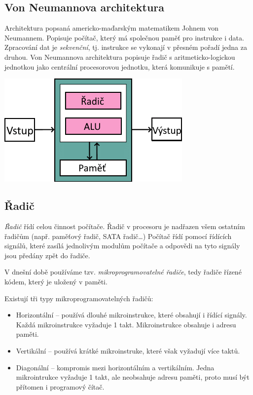 \documentclass[a4paper]{article}
\begin{document}
    \subsection{Von Neumannova architektura}
        Architektura popsaná americko-maďarským matematikem Johnem von Neumannem. Popisuje počítač, který má společnou paměť pro instrukce i data. Zpracování dat je \textit{sekvenční}, tj. instrukce se vykonají v přesném pořadí jedna za druhou. Von Neumannova architektura  popisuje řadič s aritmeticko-logickou jednotkou jako centrální procesorovou jednotku, která komunikuje s pamětí. \par
        \includegraphics{vonNeumann.png}\par
    \subsection{Řadič}
        \textit{Řadič} řídí celou činnost počítače. Řadič v procesoru je nadřazen všem ostatním řadičům (např. paměťový řadič, SATA řadič\dots)
        Počítač řídí pomocí řídících signálů, které zasílá jednolivým modulům počítače a odpovědi na tyto signály jsou předány zpět do řadiče. \par
        V dnešní době používáme tzv. \textit{mikroprogramovatelné řadiče}, tedy řadiče řízené kódem, který je uložený v paměti. \par
        Existují tři typy mikroprogramovatelných řadičů:
        \begin{itemize}
            \item Horizontální -- používá dlouhé mikroinstrukce, které obsahují i řídící signály. Každá mikroinstrukce vyžaduje 1 takt. Mikroinstrukce obsahuje i adresu paměti.
            \item Vertikální -- používá krátké mikroinstruke, které však vyžadují více taktů.
            \item Diagonální -- kompromis mezi horizontálním a vertikálním. Jedna mikrointrukce vyžaduje 1 takt, ale neobsahuje adresu paměti, proto musí být přítomen i programový čítač.
        \end{itemize}
\end{document}

